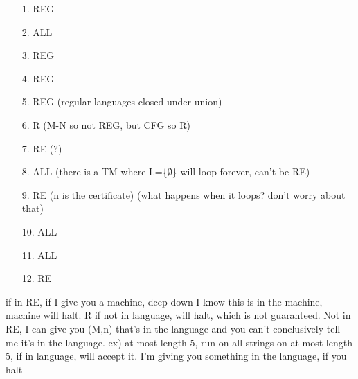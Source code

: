 \documentclass[10pt,letter]{article}
\begin{document}
\begin{enumerate}
\item[1.] REG
\item[2.] ALL
\item[3.] REG
\item[4.] REG
\item[5.] REG (regular languages closed under union)
\item[6.] R (M-N so not REG, but CFG so R)
\item[7.] RE (?)
\item[8.] ALL (there is a TM where L=\{$\emptyset$\} will loop forever, can't be RE)
\item[9.] RE (n is the certificate) (what happens when it loops? don't worry about that)
\item[10.] ALL
\item[11.] ALL
\item[12.] RE 
\end{enumerate}
if in RE, if I give you a machine, deep down I know this is in the machine, machine will halt. R if not in language, will halt, which is not guaranteed. Not in RE, I can give you (M,n) that's in the language and you can't conclusively tell me it's in the language. ex) at most length 5, run on all strings on at most length 5, if in language, will accept it. I'm giving you something in the language, if you halt
\end{document}
